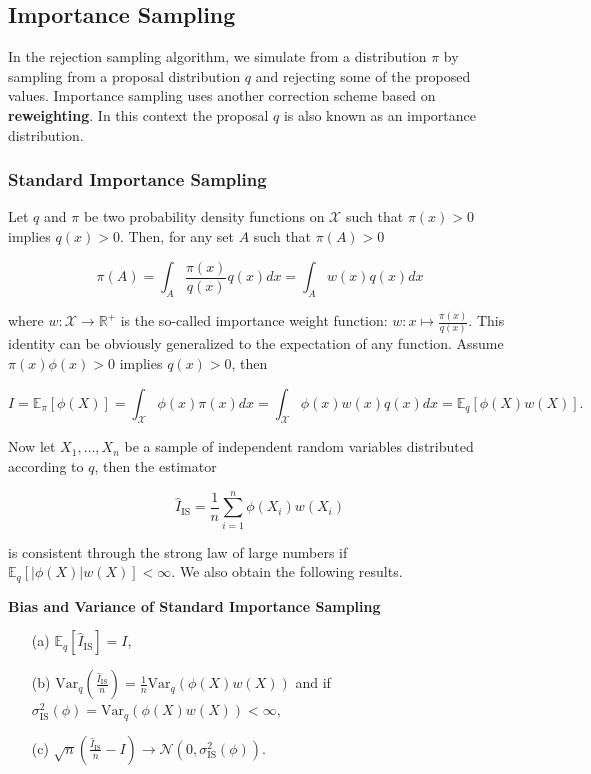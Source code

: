 \documentclass{article}
\begin{document}
\subsection{Importance Sampling}
In the rejection sampling algorithm, we simulate from a distribution $\pi$ by sampling from a proposal distribution $q$ and rejecting some of the proposed values. Importance sampling uses another correction scheme based on \textbf{reweighting}. In this context the proposal $q$ is also known as an importance distribution.

\subsubsection{Standard Importance Sampling}

Let \( q \) and \( \pi \) be two probability density functions on \( \mathcal{X} \) such that \( \pi(x) > 0 \) implies \( q(x) > 0 \). Then, for any set \( A \) such that \( \pi(A) > 0 \)

\[
\pi(A) = \int_A \frac{\pi(x)}{q(x)}q(x)dx = \int_A w(x)q(x)dx
\]

where \( w: \mathcal{X} \rightarrow \mathbb{R}^+ \) is the so-called importance weight function: \( w: x \mapsto \frac{\pi(x)}{q(x)} \). This identity can be obviously generalized to the expectation of any function. Assume \( \pi(x)\phi(x) > 0 \) implies \( q(x) > 0 \), then

\[
I = \mathbb{E}_{\pi}[\phi(X)] = \int_{\mathcal{X}} \phi(x) \pi(x) dx = \int_{\mathcal{X}} \phi(x) w(x) q(x) dx = \mathbb{E}_q[\phi(X)w(X)].
\]

Now let \( X_1, \ldots, X_n \) be a sample of independent random variables distributed according to \( q \), then the estimator

\[
\hat{I}_{\text{IS}} = \frac{1}{n} \sum_{i=1}^{n} \phi(X_i)w(X_i)
\]

is consistent through the strong law of large numbers if \( \mathbb{E}_q[|\phi(X)|w(X)] < \infty \). We also obtain the following results.

\textbf{Bias and Variance of Standard Importance Sampling}
\begin{itemize}
    \item[(a)] \( \mathbb{E}_q \left[ \hat{I}_{\text{IS}} \right] = I \),
    \item[(b)] \( \text{Var}_q \left( \frac{\hat{I}_{\text{IS}}}{n} \right) = \frac{1}{n} \text{Var}_q(\phi(X)w(X)) \) and if \( \sigma^2_{\text{IS}}(\phi) = \text{Var}_q(\phi(X)w(X)) < \infty \),
    \item[(c)] \( \sqrt{n} \left( \frac{\hat{I}_{\text{IS}}}{n} - I \right) \rightarrow \mathcal{N}(0, \sigma^2_{\text{IS}}(\phi)) \).
\end{itemize}
\end{document}

